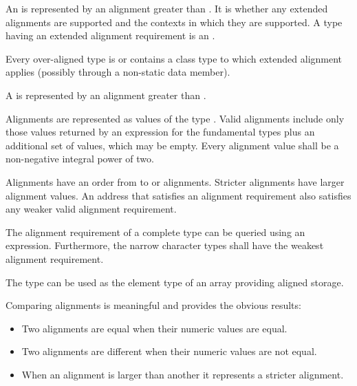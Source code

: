 \pnum
An  is represented by an alignment
greater than . It is 
whether any extended alignments are supported and the contexts in which they are
supported. A type having an extended alignment
requirement is an .
\begin{note}
Every over-aligned type is or contains a class type
to which extended alignment applies (possibly through a non-static data member).
\end{note}
A  is represented by
an alignment greater than .

\pnum
Alignments are represented as values of the type .
Valid alignments include only those values returned by an 
expression for the fundamental types plus an additional 
set of values, which may be empty.
Every alignment value shall be a non-negative integral power of two.

\pnum
Alignments have an order from  to
 or  alignments. Stricter
alignments have larger alignment values. An address that satisfies an alignment
requirement also satisfies any weaker valid alignment requirement.

\pnum
The alignment requirement of a complete type can be queried using an
 expression. Furthermore,
the narrow character types shall have the weakest
alignment requirement.
\begin{note}
The type  can be used as
the element type of an array providing aligned storage.
\end{note}

\pnum
Comparing alignments is meaningful and provides the obvious results:

\begin{itemize}
\item Two alignments are equal when their numeric values are equal.
\item Two alignments are different when their numeric values are not equal.
\item When an alignment is larger than another it represents a stricter alignment.
\end{itemize}

